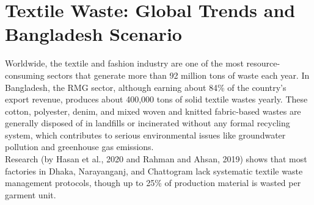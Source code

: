 \section{Textile Waste: Global Trends and Bangladesh Scenario }

Worldwide, the textile and fashion industry are one of the most resource-consuming sectors that generate more than 92 million tons of waste each year. In Bangladesh, the RMG sector, although earning about 84\% of the country's export revenue, produces about 400,000 tons of solid textile wastes yearly. These cotton, polyester, denim, and mixed woven and knitted fabric-based wastes are generally disposed of in landfills or incinerated without any formal recycling system, which contributes to serious environmental issues like groundwater pollution and greenhouse gas emissions. \\

\noindent Research (by Hasan et al., 2020 and Rahman and Ahsan, 2019) shows that most factories in Dhaka, Narayanganj, and Chattogram lack systematic textile waste management protocols, though up to 25\% of production material is wasted per garment unit. 